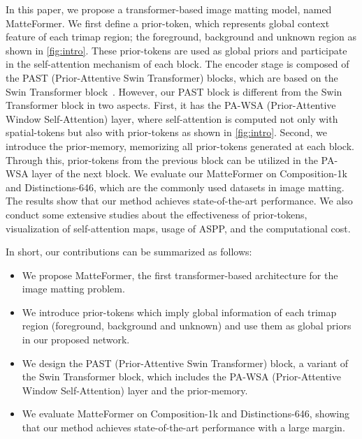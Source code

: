 \documentclass[10pt,twocolumn,letterpaper]{article}
\begin{document}
In this paper, we propose a transformer-based image matting model, named MatteFormer.
We first define a prior-token, which represents global context feature of each trimap region; the foreground, background and unknown region as shown in \cref{fig:intro}.
These prior-tokens are used as global priors and participate in the self-attention mechanism of each block.
The encoder stage is composed of the PAST (Prior-Attentive Swin Transformer) blocks, which are based on the Swin Transformer block~\cite{liu2021swin}.
However, our PAST block is different from the Swin Transformer block in two aspects. First, it has the PA-WSA (Prior-Attentive Window Self-Attention) layer, where self-attention is computed not only with spatial-tokens but also with prior-tokens as shown in \cref{fig:intro}. 
Second, we introduce the prior-memory, memorizing all prior-tokens generated at each block. Through this, prior-tokens from the previous block can be utilized in the PA-WSA layer of the next block.
We evaluate our MatteFormer on Composition-1k and Distinctions-646, which are the commonly used datasets in image matting. The results show that our method achieves state-of-the-art performance.
We also conduct some extensive studies about the effectiveness of prior-tokens, visualization of self-attention maps, usage of ASPP, and the computational cost.

In short, our contributions can be summarized as follows:
\begin{itemize}
\vspace{-2mm}
\item We propose MatteFormer, the first transformer-based architecture for the image matting problem.
\vspace{-2mm}
\item We introduce prior-tokens which imply global information of each trimap region (foreground, background and unknown) and use them as global priors in our proposed network.
\vspace{-2mm}
\item We design the PAST (Prior-Attentive Swin Transformer) block, a variant of the Swin Transformer block, which includes the PA-WSA (Prior-Attentive Window Self-Attention) layer and the prior-memory. 
\vspace{-6mm}
\item We evaluate MatteFormer on Composition-1k and Distinctions-646, showing that our method achieves state-of-the-art performance with a large margin.
\end{itemize}
\end{document}
